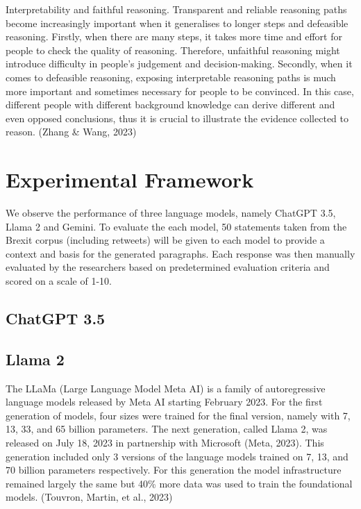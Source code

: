 \documentclass[fleqn,moreauthors,10pt]{ds_report}
\begin{document}
Interpretability and faithful reasoning. Transparent and reliable reasoning paths become increasingly important when it generalises to longer steps and defeasible reasoning. Firstly, when there are many steps, it takes more time and effort for people to check the quality of reasoning. Therefore, unfaithful reasoning might introduce difficulty in people’s judgement and decision-making. Secondly, when it comes to defeasible reasoning, exposing interpretable reasoning paths is much more important and sometimes necessary for people to be convinced. In this case, different people with different background knowledge can derive different and even opposed conclusions, thus it is crucial to illustrate the evidence collected to reason. (Zhang \& Wang, 2023)

\section*{Experimental Framework}

We observe the performance of three language models, namely ChatGPT 3.5, Llama 2 and Gemini. To evaluate the each model, 50 statements taken from the Brexit corpus (including retweets) will be given to each model to provide a context and basis for the generated paragraphs. Each response was then manually evaluated by the researchers based on predetermined evaluation criteria and scored on a scale of 1-10.

\subsection*{ChatGPT 3.5}


\subsection*{Llama 2}

The LLaMa (Large Language Model Meta AI) is a family of autoregressive language models released by Meta AI starting February 2023. For the first generation of models, four sizes were trained for the final version, namely with 7, 13, 33, and 65 billion parameters. The next generation, called Llama 2, was released on July 18, 2023 in partnership with Microsoft (Meta, 2023). This generation included only 3 versions of the language models trained on 7, 13, and 70 billion parameters respectively. For this generation the model infrastructure remained largely the same but 40\% more data was used to train the foundational models.  (Touvron, Martin, et al., 2023)
\end{document}
